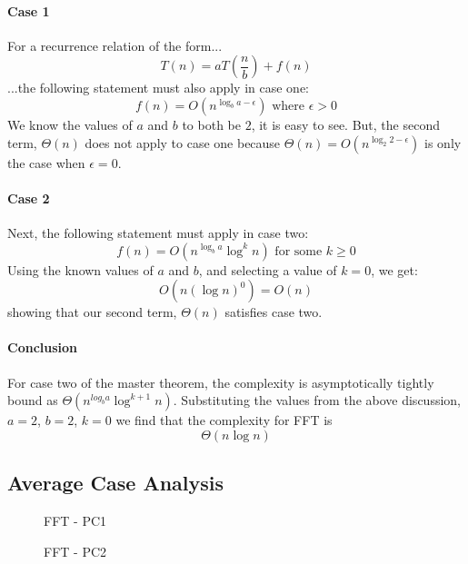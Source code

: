 \documentclass[]{article}
\begin{document}
\paragraph{Case 1}
For a recurrence relation of the form...
$$T(n) = aT(\frac{n}{b}) + f(n)$$
...the following statement must also apply in case one:
\[
f(n) = O(n^{\log_b{a - \epsilon}}) \text{ where } \epsilon > 0
\]
We know the values of $a$ and $b$ to both be $2$, it is easy to see. But, the second term, $\Theta(n)$ does not apply to case one because $\Theta(n) = O(n^{\log_2{2 - \epsilon}})$ is only the case when $\epsilon = 0$.

\paragraph{Case 2}
Next, the following statement must apply in case two:
\[
f(n) = O(n^{\log_b{a}}\log^k{n}) \text{ for some } k \geq 0
\]
Using the known values of $a$ and $b$, and selecting a value of $k = 0$, we get:
\[
O(n(\log{n})^0) = O(n)
\]
showing that our second term, $\Theta(n)$ satisfies case two.

\paragraph{Conclusion}
For case two of the master theorem, the complexity is asymptotically tightly bound as $\Theta(n^{log_b{a}}\log^{k + 1}n)$. Substituting the values from the above discussion, $a = 2$, $b = 2$, $k = 0$ we find that the complexity for FFT is $$\Theta(n\log{n})$$

\subsection{Average Case Analysis}\label{sec:fft-average}
\begin{figure}[!htbp]
	\centering
	\begin{minipage}[b]{0.4\textwidth}
		\caption{FFT - PC1\label{fig:compar3}}
	\end{minipage}
	\hfill
	\begin{minipage}[b]{0.4\textwidth}
		\caption{FFT - PC2\label{fig:compar4}}
	\end{minipage}
\end{figure}
\end{document}

